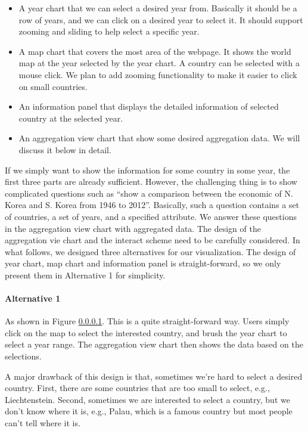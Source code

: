 \documentclass[12pt, fullpage,letterpaper]{article}
\begin{document}
\begin{itemize}
    \item A year chart that we can select a desired year from.
        Basically it should be a row of years, and we can click on a desired year to select it.
        It should support zooming and sliding to help select a specific year.
    \item A map chart that covers the most area of the webpage.
        It shows the world map at the year selected by the year chart.
        A country can be selected with a mouse click.
        We plan to add zooming functionality to make it easier to click on small countries.
    \item An information panel that displays the detailed information of selected country at the selected year.
    \item An aggregation view chart that show some desired aggregation data. We will discuss it below in detail.
\end{itemize}

If we simply want to show the information for some country in some year, the
first three parts are already sufficient.  However, the challenging thing is to
show complicated questions such as ``show a comparison between the economic of
N. Korea and S. Korea from 1946 to 2012''. Basically, such a question contains a set of countries, a
set of years, and a specified attribute.  We answer these questions in the
aggregation view chart with aggregated data. The design of the aggregation
vie chart and the interact scheme need to be carefully considered.
In what follows, we designed three alternatives for our visualization.
The design of year chart, map chart and information panel is straight-forward,
so we only present them in Alternative 1 for simplicity.

\paragraph{Alternative 1}
As shown in Figure \ref{}. 
This is a quite straight-forward way.
Users simply click on the map to select the interested country,
and brush the year chart to select a year range.
The aggregation view chart then shows the data based on the selections.

A major drawback of this design is that, sometimes we're hard to select a desired country.
First, there are some countries that are too small to select, e.g., Liechtenstein. Second, sometimes we are interested to select
a country, but we don't know where it is, e.g., Palau, which is a famous country but most people can't tell where it is.
\end{document}
